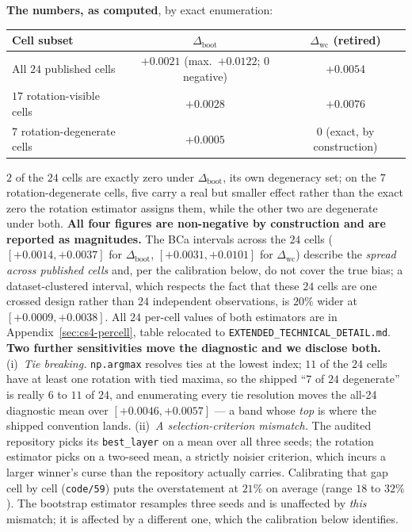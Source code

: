 \documentclass[10pt]{article} %
\begin{document}
\textbf{The numbers, as computed}, by exact enumeration:

\begin{center}\small
\begin{tabular}{lcc}
\toprule
Cell subset & $\Delta_{\text{boot}}$ & $\Delta_{\text{wc}}$ (retired) \\
\midrule
All $24$ published cells & $+0.0021$ (max.\ $+0.0122$; $0$ negative) & $+0.0054$ \\
$17$ rotation-visible cells & $+0.0028$ & $+0.0076$ \\
$7$ rotation-degenerate cells & $+0.0005$ & $0$ (exact, by construction) \\
\bottomrule
\end{tabular}
\end{center}

$2$ of the $24$ cells are exactly zero under $\Delta_{\text{boot}}$, its own
degeneracy set; on the $7$ rotation-degenerate cells, five carry a real but
smaller effect rather than the exact zero the rotation estimator assigns them,
while the other two are degenerate under both. \textbf{All four figures are
non-negative by construction and are reported as magnitudes.} The BCa intervals
across the $24$ cells ($[+0.0014,+0.0037]$ for $\Delta_{\text{boot}}$,
$[+0.0031,+0.0101]$ for $\Delta_{\text{wc}}$) describe the \emph{spread across
published cells} and, per the calibration below, do not cover the true bias; a
dataset-clustered interval, which respects the fact that these $24$ cells are
one crossed design rather than $24$ independent observations, is $20\%$ wider
at $[+0.0009,+0.0038]$. All $24$ per-cell values of both estimators are in
Appendix~\ref{sec:cs4-percell}, table relocated to
\texttt{EXTENDED\_TECHNICAL\_DETAIL.md}. \textbf{Two further sensitivities move the
diagnostic and we disclose both.} (i)~\emph{Tie breaking.} \texttt{np.argmax}
resolves ties at the lowest index; $11$ of the $24$ cells have at least one
rotation with tied maxima, so the shipped ``$7$ of $24$ degenerate'' is really
$6$ to $11$ of $24$, and enumerating every tie resolution moves the all-24
diagnostic mean over $[+0.0046,+0.0057]$ --- a band whose \emph{top} is where
the shipped convention lands. (ii)~\emph{A selection-criterion mismatch.} The
audited repository picks its \texttt{best\_layer} on a mean over all three
seeds; the rotation estimator picks on a two-seed mean, a strictly noisier
criterion, which incurs a larger winner's curse than the repository actually
carries. Calibrating that gap cell by cell (\texttt{code/59}) puts the
overstatement at $21\%$ on average (range $18$ to $32\%$). The bootstrap
estimator resamples three seeds and is unaffected by \emph{this} mismatch; it
is affected by a different one, which the calibration below identifies.
\end{document}
